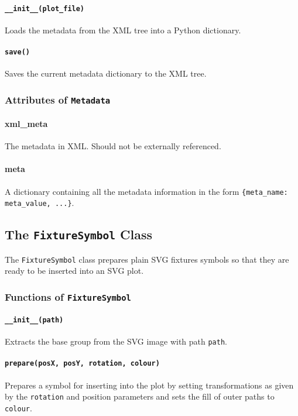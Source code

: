 \documentclass[a4paper]{article}
\begin{document}
\paragraph{\texttt{\_\_init\_\_(plot\_file)}}
Loads the metadata from the XML tree into a Python dictionary.

\paragraph{\texttt{save()}}
Saves the current metadata dictionary to the XML tree.

\subsubsection{Attributes of \texttt{Metadata}}

\paragraph{xml\_meta}
The metadata in XML. Should not be externally referenced.

\paragraph{meta}
A dictionary containing all the metadata information in the form 
\texttt{\{meta\_name: meta\_value, ...\}}.

\subsection{The \texttt{FixtureSymbol} Class}
The \texttt{FixtureSymbol} class prepares plain SVG fixtures symbols so that 
they are ready to be inserted into an SVG plot.

\subsubsection{Functions of \texttt{FixtureSymbol}}

\paragraph{\texttt{\_\_init\_\_(path)}}
Extracts the base group from the SVG image with path \texttt{path}.

\paragraph{\texttt{prepare(posX, posY, rotation, colour)}}
Prepares a symbol for inserting into the plot by setting transformations 
as given by the \texttt{rotation} and position parameters and sets the fill 
of outer paths to \texttt{colour}.
\end{document}
